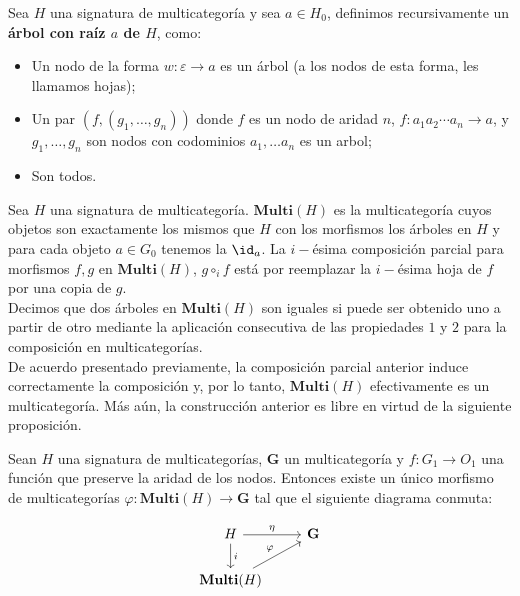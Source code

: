 \documentclass[../main.tex]{subfiles}
\begin{document}
\begin{dfn}
	Sea $H$ una signatura de multicategoría y sea $a \in H_0$, definimos recursivamente un \textbf{árbol con raíz $a$ de $H$}, como:
	\begin{itemize}
		\item Un nodo de la forma $w: \varepsilon \to a$ es un árbol (a los nodos de esta forma, les llamamos hojas);
		\item Un par $(f, (g_1, \dots , g_n))$ donde $f$ es un nodo de aridad $n$, $f:a_1a_2 \cdots a_n \to a$, y $g_1, \dots , g_n$ son nodos con codominios $a_1, \dots a_n$  es un arbol;
		\item Son todos.  
	\end{itemize}
\end{dfn}
Sea $H$ una signatura de multicategoría. $\textbf{Multi}(H)$ es la multicategoría cuyos objetos son exactamente los mismos que $H$ con los morfismos los árboles en $H$ y para cada objeto $a \in G_0$ tenemos la $\id_a$. La $i-$ésima composición parcial para morfismos $f, g$ en $\textbf{Multi}(H)$, $g \circ_i f$ está por reemplazar la $i-$ésima hoja de $f$ por una copia de $g$. \\
Decimos que dos árboles en $\textbf{Multi}(H)$ son iguales si puede ser obtenido uno a partir de otro mediante la aplicación consecutiva de las propiedades $1$ y $2$ para la composición en multicategorías. \\
De acuerdo presentado previamente, la composición parcial anterior induce correctamente la composición y, por lo tanto, $\textbf{Multi}(H)$ efectivamente es un multicategoría. 
Más aún, la construcción anterior es libre en virtud de la siguiente proposición.

\begin{prop}
	Sean $H$ una signatura de multicategorías, $\textbf{G}$ un multicategoría y $f:G_1 \to O_1$ una función que preserve la aridad de los nodos. Entonces existe un único morfismo de multicategorías $\varphi : \textbf{Multi}(H) \to \textbf{G}$ tal que el siguiente diagrama conmuta: 
	
	\[
	\begin{tikzcd}
		H \arrow{r}{\eta} \arrow{d}{i} & \textbf{G} \\
		\textbf{Multi}(H) \arrow{ur}{\varphi}
	\end{tikzcd}
	\] 
\end{prop} 

		
\end{document}

